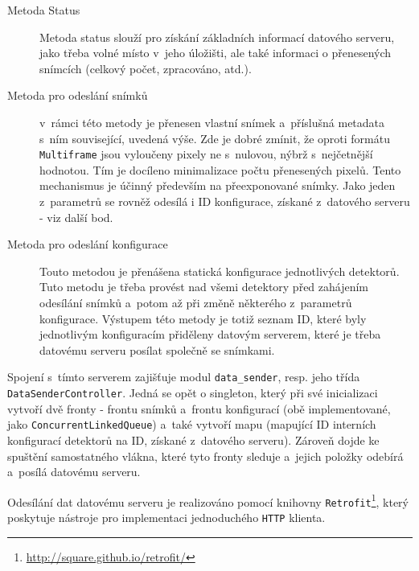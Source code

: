 \begin{description}
	\item[Metoda Status] Metoda status slouží pro získání základních informací datového serveru, jako třeba volné místo v~jeho úložišti, ale také informaci o přenesených snímcích (celkový počet, zpracováno, atd.).
	\item[Metoda pro odeslání snímků] v~rámci této metody je přenesen vlastní snímek a~příslušná metadata s~ním související, uvedená výše. Zde je dobré zmínit, že oproti formátu \texttt{Multiframe} jsou vyloučeny pixely ne s~nulovou, nýbrž s~nejčetnější hodnotou. Tím je docíleno minimalizace počtu přenesených pixelů. Tento mechanismus je účinný především na přeexponované snímky. Jako jeden z~parametrů se rovněž odesílá i ID konfigurace, získané z~datového serveru - viz další bod.
	\item[Metoda pro odeslání konfigurace] Touto metodou je přenášena statická konfigurace jednotlivých detektorů. Tuto metodu je třeba provést nad všemi detektory před zahájením odesílání snímků a~potom až při změně některého z~parametrů konfigurace. Výstupem této metody je totiž seznam ID, které byly jednotlivým konfiguracím přiděleny datovým serverem, které je třeba datovému serveru posílat společně se snímkami.
\end{description}

Spojení s~tímto serverem zajišťuje modul \texttt{data\_sender}, resp. jeho třída \texttt{DataSenderController}. Jedná se opět o singleton, který při své inicializaci vytvoří dvě fronty - frontu snímků a~frontu konfigurací (obě implementované, jako \texttt{ConcurrentLinkedQueue}) a~také vytvoří mapu (mapující ID interních konfigurací detektorů na ID, získané z~datového serveru). Zároveň dojde ke spuštění samostatného vlákna, které tyto fronty sleduje a~jejich položky odebírá a~posílá datovému serveru.

Odesílání dat datovému serveru je realizováno pomocí knihovny \texttt{Retrofit}\footnote{\url{http://square.github.io/retrofit/}}, který poskytuje nástroje pro implementaci jednoduchého \texttt{HTTP} klienta.









